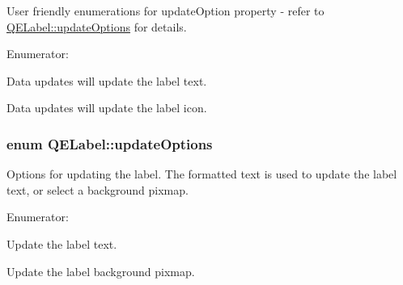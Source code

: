 User friendly enumerations for updateOption property -\/ refer to \hyperlink{classQELabel_ab16e8eccc9c9f29ca83472a52913b7f2}{QELabel::updateOptions} for details. 

\begin{Desc}
\item[Enumerator: ]\par
\begin{description}
\item[{\em 
\hypertarget{classQELabel_aae708a1c23d06d625b4f2f87bdc3fbe4adbd0c95df95a30b6ff87a5f162180b6d}{
Text}
\label{classQELabel_aae708a1c23d06d625b4f2f87bdc3fbe4adbd0c95df95a30b6ff87a5f162180b6d}
}]Data updates will update the label text. \item[{\em 
\hypertarget{classQELabel_aae708a1c23d06d625b4f2f87bdc3fbe4ac8d2c92a8dfc5f3b3a410423b5f2e60b}{
Picture}
\label{classQELabel_aae708a1c23d06d625b4f2f87bdc3fbe4ac8d2c92a8dfc5f3b3a410423b5f2e60b}
}]Data updates will update the label icon. \end{description}
\end{Desc}

\hypertarget{classQELabel_ab16e8eccc9c9f29ca83472a52913b7f2}{
\subsubsection[{updateOptions}]{\setlength{\rightskip}{0pt plus 5cm}enum {\bf QELabel::updateOptions}}}
\label{classQELabel_ab16e8eccc9c9f29ca83472a52913b7f2}
Options for updating the label. The formatted text is used to update the label text, or select a background pixmap. \begin{Desc}
\item[Enumerator: ]\par
\begin{description}
\item[{\em 
\hypertarget{classQELabel_ab16e8eccc9c9f29ca83472a52913b7f2a0b0bf0aa9ccf876976639be6e9eea7e2}{
UPDATE\_\-TEXT}
\label{classQELabel_ab16e8eccc9c9f29ca83472a52913b7f2a0b0bf0aa9ccf876976639be6e9eea7e2}
}]Update the label text. \item[{\em 
\hypertarget{classQELabel_ab16e8eccc9c9f29ca83472a52913b7f2a270826ec92fb4b1f106a8305f7d39b62}{
UPDATE\_\-PIXMAP}
\label{classQELabel_ab16e8eccc9c9f29ca83472a52913b7f2a270826ec92fb4b1f106a8305f7d39b62}
}]Update the label background pixmap. \end{description}
\end{Desc}

